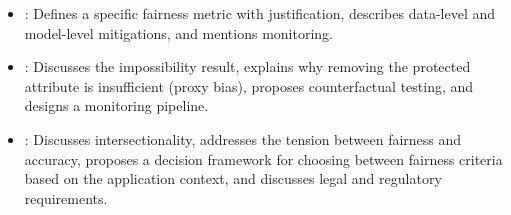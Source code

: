 \begin{interviewq}

\goodgreat
\begin{itemize}
    \item {}: Defines a specific fairness metric with justification,
    describes data-level and model-level mitigations, and mentions monitoring.
    \item {}: Discusses the impossibility result, explains why
    removing the protected attribute is insufficient (proxy bias), proposes
    counterfactual testing, and designs a monitoring pipeline.
    \item {}: Discusses intersectionality, addresses the tension
    between fairness and accuracy, proposes a decision framework for choosing
    between fairness criteria based on the application context, and discusses
    legal and regulatory requirements.
\end{itemize}

\end{interviewq}

\vspace{0.5em}

